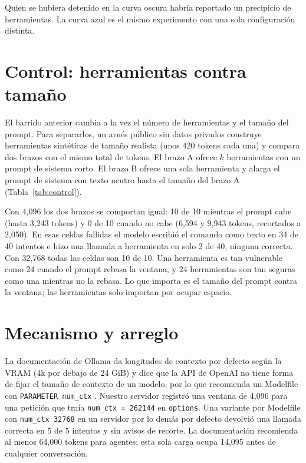 \documentclass[10pt]{article}
\begin{document}
Quien se hubiera detenido en la curva oscura habría reportado un precipicio de herramientas. La curva azul es el mismo experimento con una sola configuración distinta.

\section{Control: herramientas contra tamaño}

El barrido anterior cambia a la vez el número de herramientas y el tamaño del prompt. Para separarlos, un arnés público sin datos privados construye herramientas sintéticas de tamaño realista (unos 420 tokens cada una) y compara dos brazos con el mismo total de tokens. El brazo A ofrece $k$ herramientas con un prompt de sistema corto. El brazo B ofrece una sola herramienta y alarga el prompt de sistema con texto neutro hasta el tamaño del brazo A (Tabla~\ref{tab:control}).

Con 4,096 los dos brazos se comportan igual: 10 de 10 mientras el prompt cabe (hasta 3,243 tokens) y 0 de 10 cuando no cabe (6,594 y 9,943 tokens, recortados a 2,050). En esas celdas fallidas el modelo escribió el comando como texto en 34 de 40 intentos e hizo una llamada a herramienta en solo 2 de 40, ninguna correcta. Con 32,768 todas las celdas son 10 de 10. Una herramienta es tan vulnerable como 24 cuando el prompt rebasa la ventana, y 24 herramientas son tan seguras como una mientras no la rebasa. Lo que importa es el tamaño del prompt contra la ventana; las herramientas solo importan por ocupar espacio.

\controltable

\section{Mecanismo y arreglo}

La documentación de Ollama da longitudes de contexto por defecto según la VRAM (4k por debajo de 24 GiB) y dice que la API de OpenAI no tiene forma de fijar el tamaño de contexto de un modelo, por lo que recomienda un Modelfile con \texttt{PARAMETER num\_ctx} \cite{ollama-ctx,ollama-openai}. Nuestro servidor registró una ventana de 4,096 para una petición que traía \texttt{num\_ctx = 262144} en \texttt{options}. Una variante por Modelfile con \texttt{num\_ctx 32768} en un servidor por lo demás por defecto devolvió una llamada correcta en 5 de 5 intentos y sin avisos de recorte. La documentación recomienda al menos 64,000 tokens para agentes; esta sola carga ocupa 14,095 antes de cualquier conversación.
\end{document}

